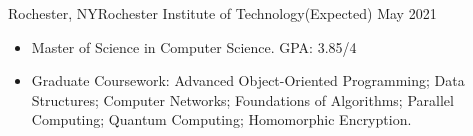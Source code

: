 \begin{cvsubsection}{Rochester, NY}{Rochester Institute of Technology}{(Expected) May 2021}
	\begin{itemize}
		\item Master of Science in Computer Science. GPA: 3.85/4
		\item Graduate Coursework: Advanced Object-Oriented Programming; Data Structures; Computer Networks; Foundations of Algorithms; Parallel Computing; Quantum Computing; Homomorphic Encryption.
	\end{itemize}
\end{cvsubsection}